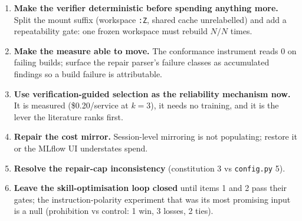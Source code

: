 \documentclass[11pt,a4paper]{article}
\begin{document}
\begin{enumerate}[leftmargin=1.4em]
  \item \textbf{Make the verifier deterministic before spending anything more.}
  Split the mount suffix (workspace \texttt{:Z}, shared cache unrelabelled) and add a
  repeatability gate: one frozen workspace must rebuild $N/N$ times.
  \item \textbf{Make the measure able to move.} The conformance instrument reads 0 on
  failing builds; surface the repair parser's failure classes as accumulated
  findings so a build failure is attributable.
  \item \textbf{Use verification-guided selection as the reliability mechanism now.}
  It is measured (\$0.20/service at $k{=}3$), it needs no training, and it is the
  lever the literature ranks first.
  \item \textbf{Repair the cost mirror.} Session-level mirroring is not populating;
  restore it or the MLflow UI understates spend.
  \item \textbf{Resolve the repair-cap inconsistency} (constitution 3 vs
  \texttt{config.py} 5).
  \item \textbf{Leave the skill-optimisation loop closed} until items 1 and 2 pass
  their gates; the instruction-polarity experiment that was its most promising
  input is a null (prohibition vs control: 1 win, 3 losses, 2 ties).
\end{enumerate}
\end{document}
